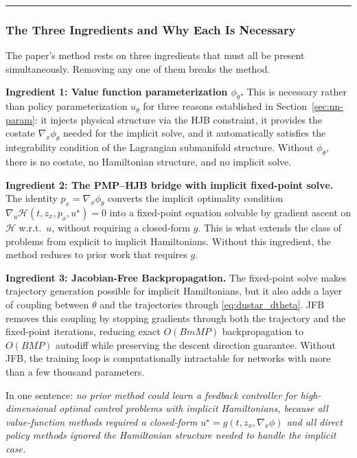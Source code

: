 \documentclass{article}
\begin{document}
\medskip\hrule\medskip

\subsubsection{The Three Ingredients and Why Each Is Necessary}

The paper's method rests on three ingredients that must all be present
simultaneously. Removing any one of them breaks the method.

\textbf{Ingredient 1: Value function parameterization $\phi_\theta$.}
This is necessary rather than policy parameterization $u_\theta$ for three
reasons established in Section~\ref{sec:nn-param}: it injects physical structure via the HJB
constraint, it provides the costate $\nabla_x\phi_\theta$ needed for the
implicit solve, and it automatically satisfies the integrability condition
of the Lagrangian submanifold structure. Without $\phi_\theta$, there is no
costate, no Hamiltonian structure, and no implicit solve.

\textbf{Ingredient 2: The PMP--HJB bridge with implicit fixed-point solve.}
The identity $p_x = \nabla_x\phi_\theta$ converts the implicit optimality
condition $\nabla_u\mathcal{H}(t,z_x,p_x,u^\star) = 0$ into a fixed-point
equation solvable by gradient ascent on $\mathcal{H}$ w.r.t.\ $u$, without requiring a closed-form $g$.
This is what extends the class of problems from explicit to implicit
Hamiltonians. Without this ingredient, the method reduces to prior work that
requires $g$.

\textbf{Ingredient 3: Jacobian-Free Backpropagation.} The fixed-point solve makes
trajectory generation possible for implicit Hamiltonians, but it also adds
a layer of coupling between $\theta$ and the trajectories through
\eqref{eq:dustar_dtheta}. JFB removes this coupling by stopping gradients
through both the trajectory and the fixed-point iterations, reducing exact
$O(BmMP)$ backpropagation to $O(BMP)$ autodiff while preserving the descent
direction guarantee. Without JFB, the training loop is computationally
intractable for networks with more than a few thousand parameters.

\medskip

In one sentence: \textit{no prior method could learn a feedback controller
for high-dimensional optimal control problems with implicit Hamiltonians,
because all value-function methods required a closed-form
$u^\star = g(t,z_x,\nabla_x\phi)$ and all direct policy methods ignored
the Hamiltonian structure needed to handle the implicit case.}
\end{document}

